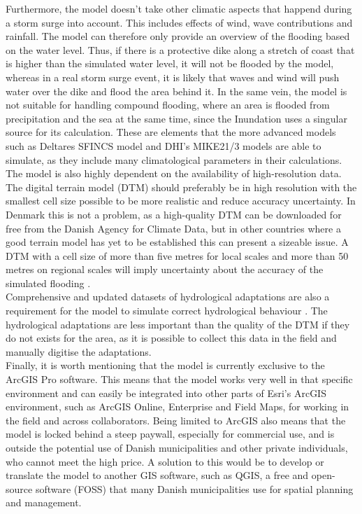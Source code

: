 Furthermore, the model doesn't take other climatic aspects that happend during a storm surge into account. This includes effects of wind, wave contributions and rainfall. The model can therefore only provide an overview of the flooding based on the water level. Thus, if there is a protective dike along a stretch of coast that is higher than the simulated water level, it will not be flooded by the model, whereas in a real storm surge event, it is likely that waves and wind will push water over the dike and flood the area behind it. In the same vein, the model is not suitable for handling compound flooding, where an area is flooded from precipitation and the sea at the same time, since the Inundation uses a singular source for its calculation.
These are elements that the more advanced models such as Deltares SFINCS model and DHI's MIKE21/3 models are able to simulate, as they include many climatological parameters in their calculations.\\

The model is also highly dependent on the availability of high-resolution data. The digital terrain model (DTM) should preferably be in high resolution with the smallest cell size possible \citep{seenath_effects_2018, williams_geographic_2022} to be more realistic and reduce accuracy uncertainty. In Denmark this is not a problem, as a high-quality DTM can be downloaded for free from the Danish Agency for Climate Data, but in other countries where a good terrain model has yet to be established this can present a sizeable issue. A DTM with a cell size of more than five metres for local scales and more than 50 metres on regional scales will imply uncertainty about the accuracy of the simulated flooding \citep{williams_geographic_2022}.\\ 
Comprehensive and updated datasets of hydrological adaptations are also a requirement for the model to simulate correct hydrological behaviour \citep{bales_sources_2009}. The hydrological adaptations are less important than the quality of the DTM if they do not exists for the area, as it is possible to collect this data in the field and manually digitise the adaptations.\\

Finally, it is worth mentioning that the model is currently exclusive to the ArcGIS Pro software. This means that the model works very well in that specific environment and can easily be integrated into other parts of Esri's ArcGIS environment, such as ArcGIS Online, Enterprise and Field Maps, for working in the field and across collaborators. Being limited to ArcGIS also means that the model is locked behind a steep paywall, especially for commercial use, and is outside the potential use of Danish municipalities and other private individuals, who cannot meet the high price. A solution to this would be to develop or translate the model to another GIS software, such as QGIS, a free and open-source software (FOSS) that many Danish municipalities use for spatial planning and management.\\

